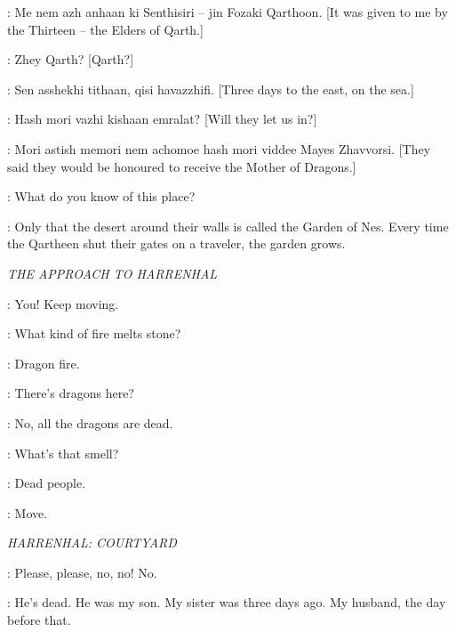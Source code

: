 \KOVARRO: Me nem azh anhaan ki Senthisiri -- jin Fozaki Qarthoon. [It was given to me by the Thirteen -- the Elders of Qarth.] 

\DAENERYS: Zhey Qarth? [Qarth?] 

\KOVARRO: Sen asshekhi tithaan, qisi havazzhifi. [Three days to the east, on the sea.] 

\DAENERYS: Hash mori vazhi kishaan emralat? [Will they let us in?] 

\KOVARRO: Mori astish memori nem achomoe hash mori viddee Mayes Zhavvorsi. [They said they would be honoured to receive the Mother of Dragons.] 


\DAENERYS: What do you know of this place? 

\JORAH: Only that the desert around their walls is called the Garden of Nes. Every time the Qartheen shut their gates on a traveler, the garden grows. 


\scene

\textit{THE APPROACH TO HARRENHAL} 


\GUARD: You! Keep moving. 

\GENDRY: What kind of fire melts stone? 

\ARYA: Dragon fire. 

\HOTPIE: There's dragons here? 

\GENDRY: No, all the dragons are dead. 

\HOTPIE: What's that smell? 

\ARYA: Dead people. 

\GUARD: Move. 



\scene

\textit{ HARRENHAL: COURTYARD}



\VICTIM: Please, please, no, no! No. 


\PEASANTWOMAN: He's dead. He was my son. My sister was three days ago. My husband, the day before that. 

